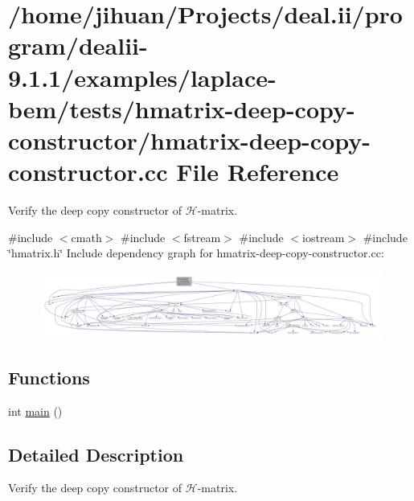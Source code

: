 \hypertarget{hmatrix-deep-copy-constructor_8cc}{}\section{/home/jihuan/\+Projects/deal.ii/program/dealii-\/9.1.1/examples/laplace-\/bem/tests/hmatrix-\/deep-\/copy-\/constructor/hmatrix-\/deep-\/copy-\/constructor.cc File Reference}
\label{hmatrix-deep-copy-constructor_8cc}


Verify the deep copy constructor of $\mathcal{H}$-\/matrix.  


{\ttfamily \#include $<$cmath$>$}\newline
{\ttfamily \#include $<$fstream$>$}\newline
{\ttfamily \#include $<$iostream$>$}\newline
{\ttfamily \#include \char`\"{}hmatrix.\+h\char`\"{}}\newline
Include dependency graph for hmatrix-\/deep-\/copy-\/constructor.cc\+:\nopagebreak
\begin{figure}[H]
\begin{center}
\leavevmode
\includegraphics[width=350pt]{hmatrix-deep-copy-constructor_8cc__incl}
\end{center}
\end{figure}
\subsection*{Functions}
\begin{DoxyCompactItemize}
\item 
int \hyperlink{hmatrix-deep-copy-constructor_8cc_ae66f6b31b5ad750f1fe042a706a4e3d4}{main} ()
\end{DoxyCompactItemize}


\subsection{Detailed Description}
Verify the deep copy constructor of $\mathcal{H}$-\/matrix. 


